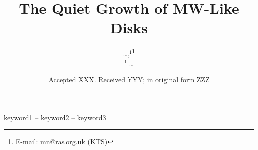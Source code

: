\documentclass[fleqn,usenatbib]{mnras}
\title[Quiet Accretion in FIRE]{The Quiet Growth of MW-Like Disks}
\author[\ldots]{
\ldots,$^{1}$\thanks{E-mail: mn@ras.org.uk (KTS)}
\\
$^1$ \ldots
}
\date{Accepted XXX. Received YYY; in original form ZZZ}
\begin{document}
\label{firstpage}
\pagerange{\pageref{firstpage}--\pageref{lastpage}}
\maketitle

\begin{abstract}
\end{abstract}

\begin{keywords}
keyword1 -- keyword2 -- keyword3
\end{keywords}


\end{document}
